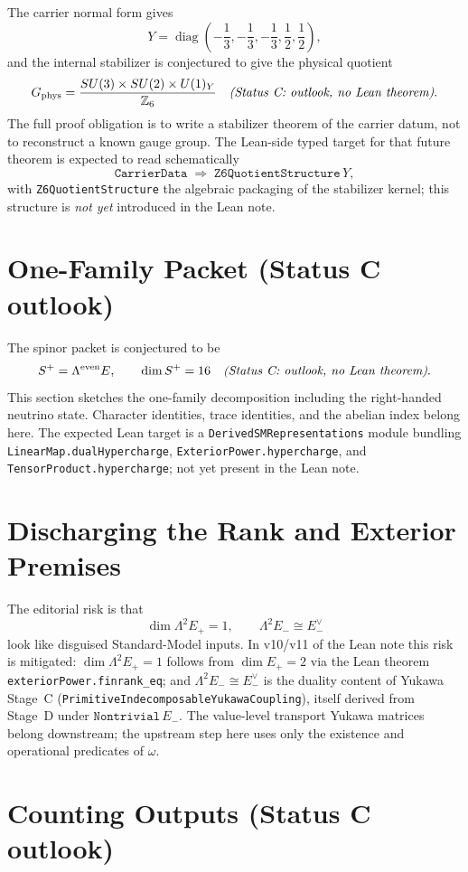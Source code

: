 The carrier normal form gives
\[
Y=\operatorname{diag}\left(-\frac13,-\frac13,-\frac13,\frac12,\frac12\right),
\]
and the internal stabilizer is conjectured to give the physical quotient
\[
G_{\mathrm{phys}}
=
\frac{SU(3)\times SU(2)\times U(1)_Y}{\mathbb Z_6}
\quad\text{\emph{(Status C: outlook, no Lean theorem)}}.
\]
The full proof obligation is to write a stabilizer theorem of the carrier datum, not to
reconstruct a known gauge group. The Lean-side typed target for that future theorem is expected
to read schematically
\[
\texttt{CarrierData}
\;\Rightarrow\;
\texttt{Z6QuotientStructure}\,Y,
\]
with \texttt{Z6QuotientStructure} the algebraic packaging of the stabilizer kernel; this
structure is \emph{not yet} introduced in the Lean note.

\section{One-Family Packet (Status C outlook)}
\label{sec:packet-outlook}

The spinor packet is conjectured to be
\[
S^+=\Lambda^{\mathrm{even}}E,
\qquad
\dim S^+=16
\quad\text{\emph{(Status C: outlook, no Lean theorem)}}.
\]
This section sketches the one-family decomposition including the right-handed neutrino state.
Character identities, trace identities, and the abelian index belong here. The expected Lean
target is a \texttt{DerivedSMRepresentations} module bundling
\texttt{LinearMap.dualHypercharge}, \texttt{ExteriorPower.hypercharge}, and
\texttt{TensorProduct.hypercharge}; not yet present in the Lean note.

\section{Discharging the Rank and Exterior Premises}

The editorial risk is that
\[
\dim \Lambda^2E_+=1,
\qquad
\Lambda^2E_-\cong E_-^\vee
\]
look like disguised Standard-Model inputs. In v10/v11 of the Lean note this risk is mitigated:
$\dim \Lambda^2 E_+ = 1$ follows from $\dim E_+ = 2$ via the Lean theorem
\texttt{exteriorPower.finrank\_eq}; and $\Lambda^2 E_- \cong E_-^\vee$ is the duality content of
Yukawa Stage~C (\texttt{PrimitiveIndecomposableYukawaCoupling}), itself derived from Stage~D under
$\texttt{Nontrivial}\,E_-$. The value-level transport Yukawa matrices belong downstream; the
upstream step here uses only the existence and operational predicates of $\omega$.

\section{Counting Outputs (Status C outlook)}
\label{sec:counting-outlook}

